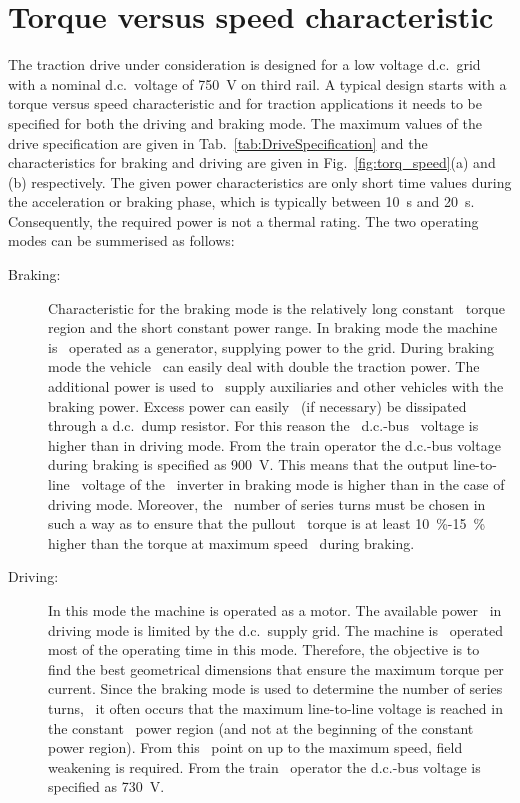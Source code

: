 \section{Torque versus speed characteristic}
The traction drive under consideration is designed for a low voltage d.c.~grid with a nominal d.c.~voltage of \SI{750}{V} on third rail. A typical design starts with a torque versus speed characteristic and for traction applications it needs to be specified for both the driving and braking mode. The maximum values of the drive specification are given in Tab.~\ref{tab:DriveSpecification} and the characteristics for braking and driving are given in Fig.~\ref{fig:torq_speed}(a) and (b) respectively. The given power characteristics are only short time values during the acceleration or braking phase, which is typically between \SI{10}{s} and \SI{20}{s}. Consequently, the required power is not a thermal rating. The two operating modes can be summerised as follows:
\begin{description}
  \item[Braking:] Characteristic for the braking mode is the relatively long constant~%
  torque region and the short constant power range. In braking mode the machine is~%
  operated as a generator, supplying power to the grid. During braking mode the vehicle~%
  can easily deal with double the traction power. The additional power is used to~%
  supply auxiliaries and other vehicles with the braking power. Excess power can easily~%
  (if necessary) be dissipated through a d.c.~dump resistor. For this reason the~%
  d.c.-bus~%
  voltage is higher than in driving mode. From the train operator the d.c.-bus voltage~%
  during braking is specified as \SI{900}{V}. This means that the output line-to-line~%
  voltage of the~%
  inverter in braking mode is higher than in the case of driving mode. Moreover, the~%
  number of series turns must be chosen in such a way as to ensure that the pullout~%
  torque is at least \SI{10}{\%}-\SI{15}{\%} higher than the torque at maximum speed~%
  during braking. 
  \item[Driving:] In this mode the machine is operated as a motor. The available power~%
  in driving mode is limited by the d.c.~supply grid. The machine is~%
  operated most of the operating time in this mode. Therefore, the objective is to~%
  find the best geometrical dimensions that ensure the maximum torque per~%
  current. Since the braking mode is used to determine the number of series turns,~%
  it often occurs that the maximum line-to-line voltage is reached in the constant~%
  power region (and not at the beginning of the constant power region). From this~%
  point on up to the maximum speed, field weakening is required. From the train~%
  operator the d.c.-bus voltage is specified as \SI{730}{V}.  
\end{description}
